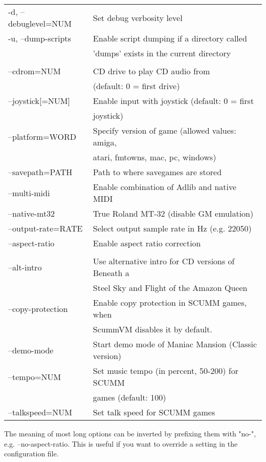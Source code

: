 \begin{tabular}{ll}
  -d, --debuglevel=NUM    &Set debug verbosity level\\
  -u, --dump-scripts      &Enable script dumping if a directory called\\
                          &'dumps' exists in the current directory\\
\\
  --cdrom=NUM             &CD drive to play CD audio from\\
                          &(default: 0 = first drive)\\
  --joystick[=NUM]        &Enable input with joystick (default: 0 = first\\
                          &joystick)\\
  --platform=WORD         &Specify version of game (allowed values: amiga,\\
                          &atari, fmtowns, mac, pc, windows)\\
  --savepath=PATH         &Path to where savegames are stored\\
  --multi-midi            &Enable combination of Adlib and native MIDI\\
  --native-mt32           &True Roland MT-32 (disable GM emulation)\\
  --output-rate=RATE      &Select output sample rate in Hz (e.g. 22050)\\
  --aspect-ratio          &Enable aspect ratio correction\\
\\
  --alt-intro             &Use alternative intro for CD versions of Beneath a\\
                          &Steel Sky and Flight of the Amazon Queen\\
  --copy-protection       &Enable copy protection in SCUMM games, when\\
                          &ScummVM disables it by default.\\
  --demo-mode             &Start demo mode of Maniac Mansion (Classic version)\\
  --tempo=NUM             &Set music tempo (in percent, 50-200) for SCUMM\\
                          &games (default: 100)\\
  --talkspeed=NUM         &Set talk speed for SCUMM games\\
\end{tabular}

The meaning of most long options can be inverted by prefixing them with "no-",
e.g. --no-aspect-ratio. This is useful if you want to override a setting in the
configuration file.

